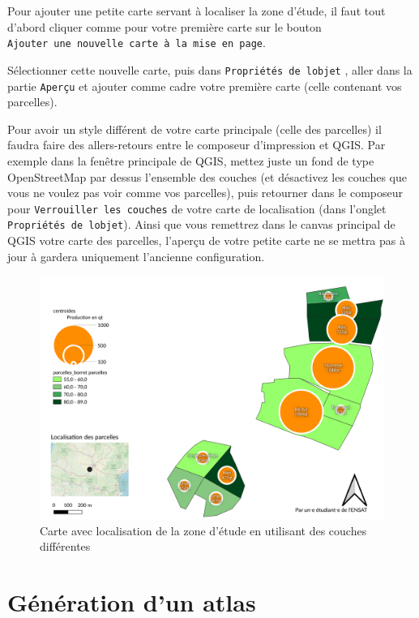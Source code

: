 Pour ajouter une petite carte servant à localiser la zone d'étude, il
faut tout d'abord cliquer comme pour votre première carte sur le bouton
\texttt{Ajouter\ une\ nouvelle\ carte\ à\ la\ mise\ en\ page}.

Sélectionner cette nouvelle carte, puis dans
\texttt{Propriétés\ de\ l\textquotesingle{}objet} , aller dans la partie
\texttt{Aperçu} et ajouter comme cadre votre première carte (celle
contenant vos parcelles).

Pour avoir un style différent de votre carte principale (celle des
parcelles) il faudra faire des allers-retours entre le composeur
d'impression et QGIS. Par exemple dans la fenêtre principale de QGIS,
mettez juste un fond de type OpenStreetMap par dessus l'ensemble des
couches (et désactivez les couches que vous ne voulez pas voir comme vos
parcelles), puis retourner dans le composeur pour
\texttt{Verrouiller\ les\ couches} de votre carte de localisation (dans
l'onglet \texttt{Propriétés\ de\ l\textquotesingle{}objet}). Ainsi que
vous remettrez dans le canvas principal de QGIS votre carte des
parcelles, l'aperçu de votre petite carte ne se mettra pas à jour à
gardera uniquement l'ancienne configuration.

\begin{figure}
\centering
\includegraphics{figures/map_withloc.png}
\caption{Carte avec localisation de la zone d'étude en utilisant des
couches différentes}
\end{figure}

\hypertarget{guxe9nuxe9ration-dun-atlas}{%
\section{Génération d'un atlas}\label{guxe9nuxe9ration-dun-atlas}}

